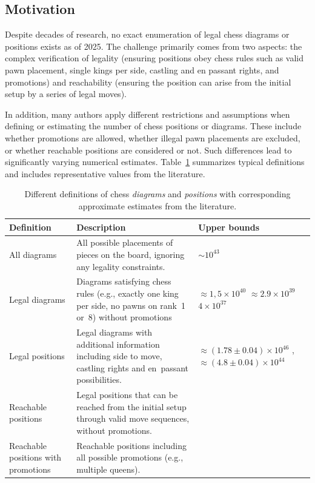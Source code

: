 \documentclass[12pt]{article}
\begin{document}
\subsection{Motivation}

Despite decades of research, no exact enumeration of legal chess diagrams or positions exists as of 2025. 
The challenge primarily comes from two aspects: the complex verification of legality 
(ensuring positions obey chess rules such as valid pawn placement, single kings per side, 
castling and en passant rights, and promotions) and reachability 
(ensuring the position can arise from the initial setup by a series of legal moves). 

In addition, many authors apply different restrictions and assumptions when defining or estimating 
the number of chess positions or diagrams. These include whether promotions are allowed, whether illegal pawn 
placements are excluded, or whether reachable positions are considered or not. Such differences lead 
to significantly varying numerical estimates. Table~\ref{tab:definitions} summarizes typical definitions 
and includes representative values from the literature.

\begin{table}[h!]
\centering
\renewcommand{\arraystretch}{1.3}
\begin{tabular}{p{3.8cm} p{6.2cm} p{4.9cm}}
\toprule
\textbf{Definition} & \textbf{Description} & \textbf{Upper bounds} \\
\midrule
All diagrams & All possible placements of pieces on the board, ignoring any legality constraints. 
& $\sim 10^{43}$ \cite{shannon1950} \\[0.3em]

Legal diagrams & Diagrams satisfying chess rules (e.g., exactly one king per side, no pawns on rank~1 or~8) without promotions 
& $\approx 1,5\times10^{40}$ \cite{steinerberger2015} $\approx 2.9\times10^{39}$ \cite{tromp2021b} $4\times 10^{37}$ \cite{gourion2021} \\[0.3em]

Legal positions & Legal diagrams with additional information including side to move, castling rights and en~passant possibilities. 
& $\approx (1.78\pm0.04)\times10^{46}$ \cite{chinchalkar1996} , $\approx (4.8\pm0.04)\times10^{44}$ \cite{tromp2021b} \\[0.3em]

Reachable positions & Legal positions that can be reached from the initial setup through valid move sequences, without promotions. 
&  \\[0.3em]

Reachable positions with promotions & Reachable positions including all possible promotions (e.g., multiple queens). 
& \\
\bottomrule
\end{tabular}
\caption{Different definitions of chess \textit{diagrams} and \textit{positions} with corresponding approximate estimates from the literature.}
\label{tab:definitions}
\end{table}
\end{document}
